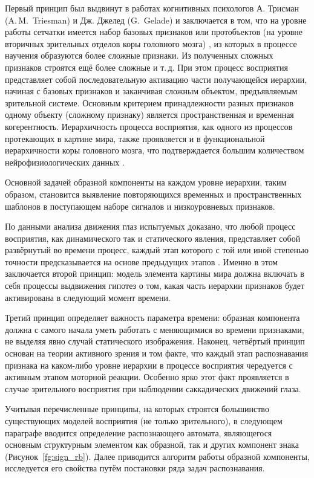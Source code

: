 Первый принцип был выдвинут в работах когнитивных психологов А. Трисман (A.\,M.~Triesman) и Дж. Джелед (G.~Gelade) \cite{Triesman1980} и заключается в том, что на уровне работы сетчатки имеется набор базовых признаков  или протобъектов (на уровне вторичных зрительных отделов коры головного мозга) \cite{Rensink2000}, из которых в процессе научения образуются более сложные признаки. Из полученных сложных признаков строятся ещё более сложные и т.\,д. При этом процесс восприятия представляет собой последовательную активацию части получающейся иерархии, начиная с базовых признаков и заканчивая сложным объектом, предъявляемым зрительной системе. Основным критерием принадлежности разных признаков одному объекту (сложному признаку) является пространственная и временная когерентность. Иерархичность процесса восприятия, как одного из процессов протекающих в картине мира, также проявляется и в функциональной иерархичности коры головного мозга, что подтверждается большим количеством нейрофизиологических данных \cite{Hawkins2009, Bolotova2011}.

Основной задачей образной компоненты на каждом уровне иерархии, таким образом, становится выявление повторяющихся временных и пространственных шаблонов в поступающем наборе сигналов и низкоуровневых признаков.

По данными анализа движения глаз испытуемых доказано, что любой процесс восприятия, как динамического так и статического явления, представляет собой развёрнутый во времени процесс, каждый этап которого с той или иной степенью точности предсказывается на основе предыдущих этапов \cite{Velichkovsky2006, Hawkins2009}. Именно в этом заключается второй принцип: модель элемента картины мира должна включать в себя процессы выдвижения гипотез о том, какая часть иерархии признаков будет активирована в следующий момент времени.

Третий принцип определяет важность параметра времени: образная компонента должна с самого начала уметь работать с меняющимися во времени признаками, не выделяя явно случай статического изображения. Наконец, четвёртый принцип основан на теории активного зрения и том факте, что каждый этап распознавания признака на каком-либо уровне иерархии в процессе восприятия чередуется с активным этапом моторной реакции. Особенно ярко этот факт проявляется в случае зрительного восприятия при наблюдении саккадических движений глаза.

Учитывая перечисленные принципы, на которых строятся большинство существующих моделей восприятия (не только зрительного), в следующем параграфе вводится определение распознающего автомата, являющегося основным структурным элементом как образной, так и других компонент знака (Рисунок~\ref{fg:sign_rb}). Далее приводится алгоритм работы образной компоненты, исследуется его свойства путём постановки ряда задач распознавания.


